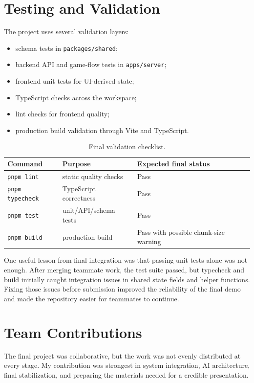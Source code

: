 \documentclass[11pt]{article}
\begin{document}
\section{Testing and Validation}

The project uses several validation layers:

\begin{itemize}
  \item schema tests in \texttt{packages/shared};
  \item backend API and game-flow tests in \texttt{apps/server};
  \item frontend unit tests for UI-derived state;
  \item TypeScript checks across the workspace;
  \item lint checks for frontend quality;
  \item production build validation through Vite and TypeScript.
\end{itemize}

\begin{table}[h]
\centering
\begin{tabular}{lll}
\toprule
Command & Purpose & Expected final status \\
\midrule
\texttt{pnpm lint} & static quality checks & Pass \\
\texttt{pnpm typecheck} & TypeScript correctness & Pass \\
\texttt{pnpm test} & unit/API/schema tests & Pass \\
\texttt{pnpm build} & production build & Pass with possible chunk-size warning \\
\bottomrule
\end{tabular}
\caption{Final validation checklist.}
\end{table}

One useful lesson from final integration was that passing unit tests alone was
not enough. After merging teammate work, the test suite passed, but typecheck
and build initially caught integration issues in shared state fields and helper
functions. Fixing those issues before submission improved the reliability of the
final demo and made the repository easier for teammates to continue.

\section{Team Contributions}

The final project was collaborative, but the work was not evenly distributed at
every stage. My contribution was strongest in system integration, AI architecture,
final stabilization, and preparing the materials needed for a credible
presentation.
\end{document}
